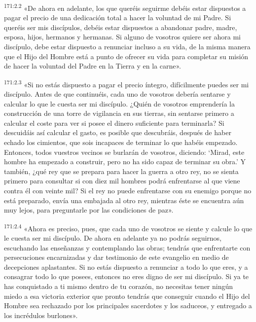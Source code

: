 \par 
\textsuperscript{171:2.2} «De ahora en adelante, los que queréis seguirme debéis estar dispuestos a pagar el precio de una dedicación total a hacer la voluntad de mi Padre. Si queréis ser mis discípulos, debéis estar dispuestos a abandonar padre, madre, esposa, hijos, hermanos y hermanas. Si alguno de vosotros quiere ser ahora mi discípulo, debe estar dispuesto a renunciar incluso a su vida, de la misma manera que el Hijo del Hombre está a punto de ofrecer su vida para completar su misión de hacer la voluntad del Padre en la Tierra y en la carne».

\par 
\textsuperscript{171:2.3} «Si no estás dispuesto a pagar el precio íntegro, difícilmente puedes ser mi discípulo. Antes de que continuéis, cada uno de vosotros debería sentarse y calcular lo que le cuesta ser mi discípulo. ¿Quién de vosotros emprendería la construcción de una torre de vigilancia en sus tierras, sin sentarse primero a calcular el coste para ver si posee el dinero suficiente para terminarla? Si descuidáis así calcular el gasto, es posible que descubráis, después de haber echado los cimientos, que sois incapaces de terminar lo que habéis empezado. Entonces, todos vuestros vecinos se burlarán de vosotros, diciendo: `Mirad, este hombre ha empezado a construir, pero no ha sido capaz de terminar su obra.' Y también, ¿qué rey que se prepara para hacer la guerra a otro rey, no se sienta primero para consultar si con diez mil hombres podrá enfrentarse al que viene contra él con veinte mil? Si el rey no puede enfrentarse con su enemigo porque no está preparado, envía una embajada al otro rey, mientras éste se encuentra aún muy lejos, para preguntarle por las condiciones de paz».

\par 
\textsuperscript{171:2.4} «Ahora es preciso, pues, que cada uno de vosotros se siente y calcule lo que le cuesta ser mi discípulo. De ahora en adelante ya no podrás seguirnos, escuchando las enseñanzas y contemplando las obras; tendrás que enfrentarte con persecuciones encarnizadas y dar testimonio de este evangelio en medio de decepciones aplastantes. Si no estás dispuesto a renunciar a todo lo que eres, y a consagrar todo lo que posees, entonces no eres digno de ser mi discípulo. Si ya te has conquistado a ti mismo dentro de tu corazón, no necesitas tener ningún miedo a esa victoria exterior que pronto tendrás que conseguir cuando el Hijo del Hombre sea rechazado por los principales sacerdotes y los saduceos, y entregado a los incrédulos burlones».

